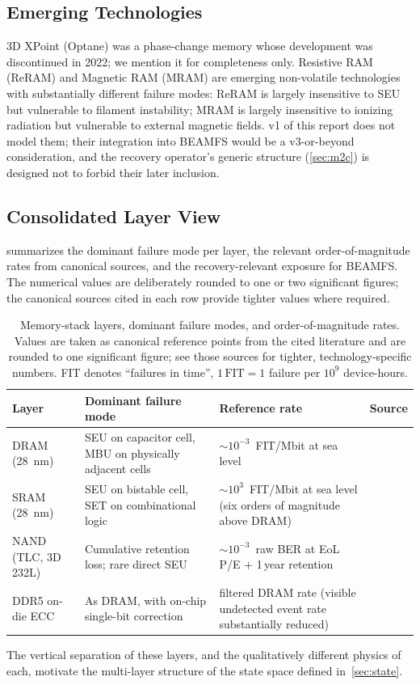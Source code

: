 \subsection{Emerging Technologies}\label{sub:emerging}

3D XPoint (Optane) was a phase-change memory whose development was
discontinued in 2022; we mention it for completeness only.
Resistive RAM (ReRAM) and Magnetic RAM (MRAM) are emerging
non-volatile technologies with substantially different failure
modes: ReRAM is largely insensitive to SEU but vulnerable to
filament instability; MRAM is largely insensitive to ionizing
radiation but vulnerable to external magnetic fields. v1 of this
report does not model them; their integration into BEAMFS would
be a v3-or-beyond consideration, and the recovery operator's
generic structure (\cref{sec:m2c}) is designed not to forbid
their later inclusion.

\subsection{Consolidated Layer View}\label{sub:layer-table}

 summarizes the dominant failure mode per
layer, the relevant order-of-magnitude rates from canonical sources,
and the recovery-relevant exposure for BEAMFS. The numerical
values are deliberately rounded to one or two significant figures;
the canonical sources cited in each row provide tighter values
where required.

\begin{table}[t]
\centering\small
\caption{Memory-stack layers, dominant failure modes, and order-of-magnitude
rates. Values are taken as canonical reference points from the cited
literature and are rounded to one significant figure; see those
sources for tighter, technology-specific numbers. FIT denotes
``failures in time'', \(\mathrm{1\,FIT} = \mathrm{1}\) failure per
\(10^{9}\) device-hours.}
\label{tab:layer-physics}
\begin{tabularx}{\textwidth}{l X l X}
\toprule
\textbf{Layer} & \textbf{Dominant failure mode} & \textbf{Reference rate} & \textbf{Source} \\
\midrule
DRAM (28~nm)  & SEU on capacitor cell, MBU on physically adjacent cells &
\(\sim 10^{-3}\)~FIT/Mbit at sea level &
\cite{baumann2005,jedec89a} \\
\addlinespace[0.3em]
SRAM (28~nm) & SEU on bistable cell, SET on combinational logic &
\(\sim 10^{3}\)~FIT/Mbit at sea level (six orders of magnitude above DRAM) &
\cite{dodd2003,baumann2005} \\
\addlinespace[0.3em]
NAND (TLC, 3D 232L) & Cumulative retention loss; rare direct SEU &
\(\sim 10^{-3}\)~raw BER at EoL P/E + 1\,year retention &
\cite{cai2017nand,mielke2017,jedec218b} \\
\addlinespace[0.3em]
DDR5 on-die ECC      & As DRAM, with on-chip single-bit correction & filtered DRAM rate (visible undetected event rate substantially reduced) &
\cite{jedec79-5} \\
\bottomrule
\end{tabularx}
\end{table}

The vertical separation of these layers, and the qualitatively
different physics of each, motivate the multi-layer structure of
the state space defined in~\cref{sec:state}.
